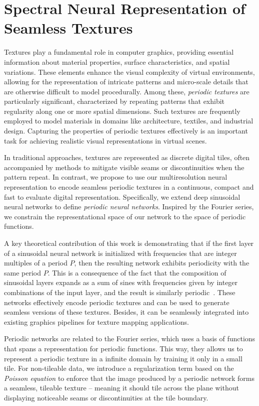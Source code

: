 \chapter{Spectral Neural Representation of Seamless Textures}
\label{chap:seamless-textures}

Textures play a fundamental role in computer graphics, providing essential information about material properties, surface characteristics, and spatial variations. These elements enhance the visual complexity of virtual environments, allowing for the representation of intricate patterns and micro-scale details that are otherwise difficult to model procedurally. Among these, \textit{periodic textures} are particularly significant, characterized by repeating patterns that exhibit regularity along one or more spatial dimensions. Such textures are frequently employed to model materials in domains like architecture, textiles, and industrial design. Capturing the properties of periodic textures effectively is an important task for achieving realistic visual representations in virtual scenes.

In traditional approaches, textures are represented as discrete digital tiles, often accompanied by methods to mitigate visible seams or discontinuities when the pattern repeat. In contrast, we propose to use our multiresolution neural representation to encode seamless periodic textures in a continuous, compact and fast to evaluate digital representation. Specifically, we extend deep sinusoidal neural networks to define \textit{periodic neural networks}. Inspired by the Fourier series, we constrain the representational space of our network to the space of periodic functions.

A key theoretical contribution of this work is demonstrating that if the first layer of a sinusoidal neural network is initialized with frequencies that are integer multiples of a period $P$, then the resulting network exhibits periodicity with the same period $P$. This is a consequence of the fact that the composition of sinusoidal layers expands as a sum of sines with frequencies given by integer combinations of the input layer, and the result is similarly periodic~\citep{novello2022understanding, yuce2022structured}. These networks effectively encode periodic textures and can be used to generate seamless versions of these textures. Besides, it can be seamlessly integrated into existing graphics pipelines for texture mapping applications.

Periodic networks are related to the Fourier series, which uses a basis of functions that spans a representation for periodic functions. This way, they allows us to represent a periodic texture in a infinite domain by training it only in a small tile. For non-tileable data, we introduce a regularization term based on the \textit{Poisson equation} to enforce that the image produced by a periodic network forms a seamless, tileable texture -- meaning it should tile across the plane without displaying noticeable seams or discontinuities at the tile boundary. 

